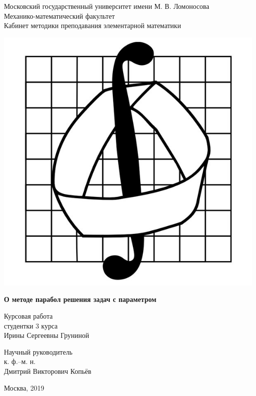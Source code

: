 \thispagestyle {empty}

\begin {center}
    Московский государственный университет имени М. В. Ломоносова \\
    Механико-математический факультет \\
    Кабинет методики преподавания элементарной математики
\end {center}

\vspace*{\fill}

\begin {center}
    \includegraphics [width = 0.3 \textwidth] {images/mm-logo.jpg}
\end {center}

\vspace*{\fill}

\begin {center}
    \LARGE{\textbf{О методе парабол решения задач с параметром}}
\end {center}

\vspace*{\fill}

\begin {center}
    Курсовая работа \\
    студентки 3 курса \\
    Ирины Сергеевны Груниной
\end {center}

\vspace*{\fill}

\begin {flushright}
    Научный руководитель \\
    к. ф.--м. н.\\
    Дмитрий Викторович Копьёв
\end {flushright}

\vspace*{\fill}

\begin {center}
    Москва, 2019
\end {center}

\pagebreak
